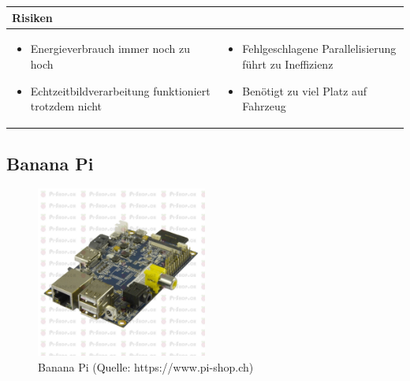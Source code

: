 \begin{table}[h]
\begin{tabular}{p{}p{}}


 \textbf{Risiken} & \\ \hline
	 
\begin{itemize}
\item Energieverbrauch immer noch zu hoch
\item Echtzeitbildverarbeitung funktioniert trotzdem nicht
\end{itemize}
&
\begin{itemize}
\item Fehlgeschlagene Parallelisierung führt zu Ineffizienz
\item Benötigt zu viel Platz auf Fahrzeug
\end{itemize}
 
\end{tabular}
\end{table}

\pagebreak

\subsection{Banana Pi}

\begin{figure}[h!]%
\centering
\includegraphics[width=0.5\textwidth]{fig/PIBanana.jpg}
\caption{Banana Pi (Quelle: https://www.pi-shop.ch)}
\label{fig:Banana Pi}
\end{figure}

